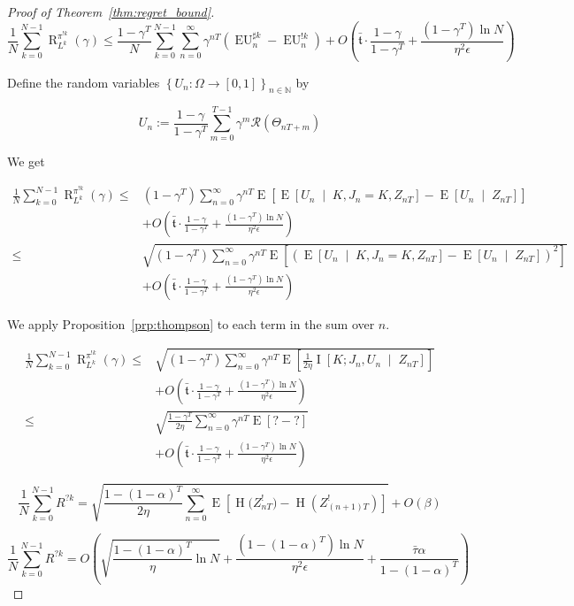 \documentclass[anon,12pt]{colt2018} %
\newcommand{\Comment}[1]{}
\newcommand{\AP}[1]{\left(#1\right)}
\newcommand{\AB}[1]{\left[#1\right]}
\newcommand{\AC}[1]{\left\{#1\right\}}
\newcommand{\ABM}[2]{\left[#1\;\middle\vert\;#2\right]}
\newcommand{\E}[1]{\underset{#1}{\operatorname{E}}}
\newcommand{\Ea}[2]{\underset{#1}{\operatorname{E}}\AB{#2}}
\newcommand{\CE}[3]{\underset{#1}{\operatorname{E}}\ABM{#2}{#3}}
\newcommand{\CI}[3]{\underset{#1}{\operatorname{I}}\ABM{#2}{#3}}
\newcommand{\En}{\operatorname{H}}
\newcommand{\Nats}{\mathbb{N}}
\newcommand{\R}{\mathcal{R}}
\newcommand{\EU}{\operatorname{EU}}
\newcommand{\Rg}{\operatorname{R}}
\newcommand{\Tn}{\mathfrak{t}}
\newcommand{\IP}{\pi^{!k}}
\begin{document}
\begin{proof}[Proof of Theorem~\ref{thm:regret_bound}]
\[\frac{1}{N}\sum_{k=0}^{N-1}\Rg_{L^k}^{\IP}(\gamma) \leq \frac{1-\gamma^T}{N}\sum_{k=0}^{N-1}\sum_{n=0}^\infty \gamma^{nT}\AP{\EU^{\sharp k}_n-\EU^{!k}_n}+O\AP{\bar{\Tn}\cdot\frac{1-\gamma}{1-\gamma^T}+\frac{\AP{1-\gamma^T}\ln{N}}{\eta^2\epsilon}}\]

Define the random variables $\AC{U_n : \Omega \rightarrow [0,1]}_{n\in\Nats}$ by 

$$U_n:=\frac{1-\gamma}{1-\gamma^T}\sum_{m=0}^{T-1} \gamma^{m} \R\AP{\Theta_{nT+m}}$$

\Comment{Denote 

$$\beta:=\frac{\AP{1-(1-\alpha)^T}\ln N}{\eta^2\epsilon}+\frac{\bar{\tau}\alpha}{1-(1-\alpha)^T}$$}

We get

\begin{align*}
\frac{1}{N}\sum_{k=0}^{N-1}\Rg_{L^k}^{\IP}(\gamma) \leq &\AP{1-\gamma^T}\sum_{n=0}^\infty \gamma^{nT} \Ea{}{\CE{}{U_n}{K, J_n = K, Z_{nT}}-\CE{}{U_n}{Z_{nT}}} \\ 
&+ O\AP{\bar{\Tn}\cdot\frac{1-\gamma}{1-\gamma^T}+\frac{\AP{1-\gamma^T}\ln{N}}{\eta^2\epsilon}}\\
\leq &\sqrt{\AP{1-\gamma^T}\sum_{n=0}^\infty \gamma^{nT} \Ea{}{\AP{\CE{}{U_n}{K, J_n = K, Z_{nT}}-\CE{}{U_n}{Z_{nT}}}^2}} \\ 
&+ O\AP{\bar{\Tn}\cdot\frac{1-\gamma}{1-\gamma^T}+\frac{\AP{1-\gamma^T}\ln{N}}{\eta^2\epsilon}}
\end{align*}

We apply Proposition~\ref{prp:thompson} to each term in the sum over $n$.

\begin{align*}
\frac{1}{N}\sum_{k=0}^{N-1}\Rg_{L^k}^{\IP}(\gamma) \leq &\sqrt{\AP{1-\gamma^T}\sum_{n=0}^\infty \gamma^{nT} \Ea{}{\frac{1}{2\eta}\CI{}{K;J_n,U_n}{Z_{nT}}}} \\
&+ O\AP{\bar{\Tn}\cdot\frac{1-\gamma}{1-\gamma^T}+\frac{\AP{1-\gamma^T}\ln{N}}{\eta^2\epsilon}}\\
\leq &\sqrt{\frac{1-\gamma^T}{2\eta}\sum_{n=0}^\infty \gamma^{nT} \Ea{}{?-?}} \\
&+ O\AP{\bar{\Tn}\cdot\frac{1-\gamma}{1-\gamma^T}+\frac{\AP{1-\gamma^T}\ln{N}}{\eta^2\epsilon}}
\end{align*}

$$\frac{1}{N}\sum_{k=0}^{N-1}R^{?k} = \sqrt{\frac{1-(1-\alpha)^T}{2\eta}\sum_{n=0}^\infty \E{}\left[\En\Big(Z^!_{nT}\Big)-\En\left(Z^!_{(n+1)T}\right)\right]} + O\AP{\beta}$$

$$\frac{1}{N}\sum_{k=0}^{N-1}R^{?k} = O\left(\sqrt{\frac{1-(1-\alpha)^T}{\eta}\ln N}  +\frac{\AP{1-(1-\alpha)^T}\ln N}{\eta^2\epsilon}+\frac{\bar{\tau}\alpha}{1-(1-\alpha)^T}\right)$$


\end{proof}
\end{document}
